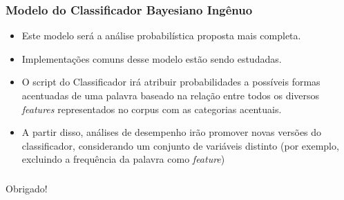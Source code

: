 \documentclass[xcolor=table]{beamer}
\begin{document}
	\begin{frame} 
		\frametitle{Modelo do Classificador Bayesiano Ingênuo}
		\begin{itemize}
			\item Este modelo será a análise probabilística proposta mais completa.\\
			\item Implementações comuns desse modelo estão sendo estudadas.\\
			\item O script do Classificador irá atribuir probabilidades a possíveis formas acentuadas de uma palavra baseado na relação entre todos os diversos \textit{features} representados no corpus com as categorias acentuais.\\
			\item A partir disso, análises de desempenho irão promover novas versões do classificador, considerando um conjunto de variáveis distinto (por exemplo, excluindo a frequência da palavra como \textit{feature})\\
		\end{itemize}
	\end{frame}

	\begin{frame}
		\frametitle{}
		\centering
		\huge{Obrigado!}
	\end{frame}
\end{document}
